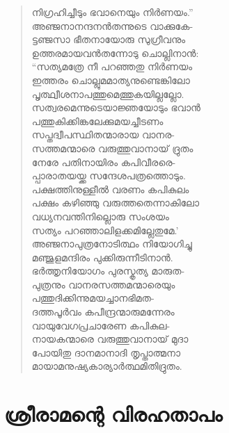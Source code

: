 \begin{verse}
നിഗ്രഹിച്ചീടും ഭവാനെയും നിര്‍ണയം.”\\
അഞ്ജനാനന്ദനന്‍തന്നുടെ വാക്കുകേ-\\
ട്ടഞ്ജസാ ഭീതനായോരു സുഗ്രീവനും\\
ഉത്തരമായവന്‍തന്നോടു ചൊല്ലിനാന്‍:\\
“സത്യമത്രേ നീ പറഞ്ഞതു നിര്‍ണയം\\
ഇത്തരം ചൊല്ലുമമാത്യനുണ്ടെങ്കിലോ\\
പൃത്ഥ്വീശനാപത്തുമെത്തുകയില്ലല്ലോ.\\
സത്വരമെന്നുടെയാജ്ഞയോടും ഭവാന്‍\\
പത്തുകിക്കിങ്കലേക്കുമയച്ചീടണം\\
സപ്തദ്വീപസ്ഥിതന്മാരായ വാനര-\\
സത്തമന്മാരെ വരുത്തുവാനായ് ദ്രുതം\\
നേരേ പതിനായിരം കപിവീരരെ-\\
പ്പാരാതയയ്ക്ക സന്ദേശപത്രത്തൊടും.\\
പക്ഷത്തിനുള്ളീല്‍ വരണം കപികുലം\\
പക്ഷം കഴിഞ്ഞു വരുത്തതെന്നാകിലോ\\
വധ്യനവന്തിനില്ലൊരു സംശയം\\
സത്യം പറഞ്ഞാലിളക്കമില്ലേതുമേ.’\\
അഞ്ജനാപുത്രനോടിത്ഥം നിയോഗിച്ചു\\
മഞ്ജുളമന്ദിരം പുക്കിരുന്നീടിനാന്‍.\\
ഭര്‍ത്തൃനിയോഗം പുരസ്കൃത്യ മാരുത-\\
പുത്രനും വാനരസത്തമന്മാരെയും\\
പത്തുദിക്കിന്നുമയച്ചാനഭിമത-\\
ദത്തപൂര്‍വം കപീന്ദ്രന്മാരുമന്നേരം\\
വായുവേഗപ്രചാരേണ കപികുല-\\
നായകന്മാരെ വരുത്തുവാനായ് മുദാ\\
പോയിതു ദാനമാനാദി തൃപ്താത്മനാ\\
മായാമനുഷ്യകാര്യാര്‍ത്ഥമിതിദ്രുതം.
\end{verse}


\section{ശ്രീരാമന്റെ വിരഹതാപം}


